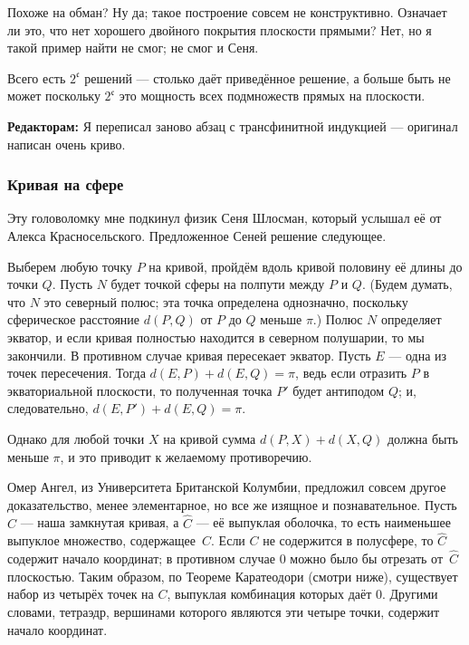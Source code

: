 Похоже на обман?
Ну да; такое построение совсем не конструктивно.
Означает ли это, что нет хорошего двойного покрытия плоскости прямыми?
Нет, но я такой пример найти не смог; не смог и Сеня.

\begin{addedbytheeditors}
Всего есть $2^{\mathfrak{c}}$ решений --- столько даёт приведённое решение, а больше быть не может поскольку $2^{\mathfrak{c}}$ это мощность всех подмножеств прямых на плоскости. 

\textbf{Редакторам:} Я переписал заново абзац с трансфинитной индукцией --- оригинал написан очень криво.
\end{addedbytheeditors}


\subsubsection*{Кривая на сфере}

Эту головоломку мне подкинул физик Сеня Шлосман, который услышал её от Алекса Красносельского.
Предложенное Сеней решение следующее.

Выберем любую точку $P$ на кривой, пройдём вдоль кривой половину её длины до точки $Q$.
Пусть $N$ будет точкой сферы на полпути между $P$ и $Q$.
(Будем думать, что $N$ это северный полюс; эта точка определена однозначно, поскольку сферическое расстояние $d(P, Q)$ от $P$ до $Q$ меньше $\pi$.)
Полюс $N$ определяет экватор, и если кривая полностью находится в северном полушарии, то мы закончили.
В противном случае кривая пересекает экватор.
Пусть $E$ --- одна из точек пересечения.
Тогда $d(E,P) + d(E,Q) = \pi$, ведь если отразить $P$ в экваториальной плоскости, то полученная точка $P'$ будет антиподом $Q$; и, следовательно, $d(E, P') + d(E, Q) = \pi$.

Однако для любой точки $X$ на кривой сумма $d(P, X) + d(X, Q)$ должна быть меньше $\pi$, и это приводит к желаемому противоречию.

Омер Ангел, из Университета Британской Колумбии,
предложил совсем другое доказательство,
менее элементарное, но все же изящное и познавательное.
Пусть $C$ --- наша замкнутая кривая, а $\hat C$ --- её выпуклая оболочка, то есть наименьшее выпуклое множество, содержащее~$C$.
Если $C$ не содержится в полусфере, то $\hat C$ содержит начало координат;
в противном случае $0$ можно было бы отрезать от~$\hat C$ плоскостью.
Таким образом, по Теореме Каратеодори (смотри ниже), существует набор из четырёх точек на $C$, выпуклая комбинация которых даёт $0$.
Другими словами, тетраэдр, вершинами которого являются эти четыре точки, содержит начало координат.

